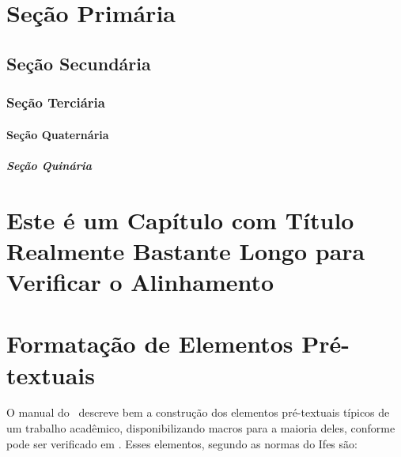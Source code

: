 \documentclass[times,english,brazil,oneside,section=TITLE]{ifes8}
\begin{document}
\chapter{Seção Primária}
\label{cha:secao-primaria}

\blindtext[1]

\section{Seção Secundária}
\label{sec:secao-secundaria}

\blindtext[1]

\subsection{Seção Terciária}
\label{sec:secao-terciaria}

\blindtext[1]

\subsubsection{Seção Quaternária}
\label{sec:secao-quaternaria}

\blindtext[1]

\paragraph{Seção Quinária}
\label{sec:secao-quinaria}

\blindtext[1]


\chapter{Este é um Capítulo com Título Realmente Bastante
  Longo para Verificar o Alinhamento}


\blindtext



\chapter{Formatação de Elementos Pré-textuais}
\label{cha:format-pre-text}

O manual do \abnTeX\ descreve bem a construção dos elementos
pré-textuais típicos de um trabalho acadêmico, disponibilizando macros
para a maioria deles, conforme pode ser verificado em
\cite[cap.~6]{Araujo2016}. Esses elementos, segundo as normas do Ifes
são:
\end{document}
